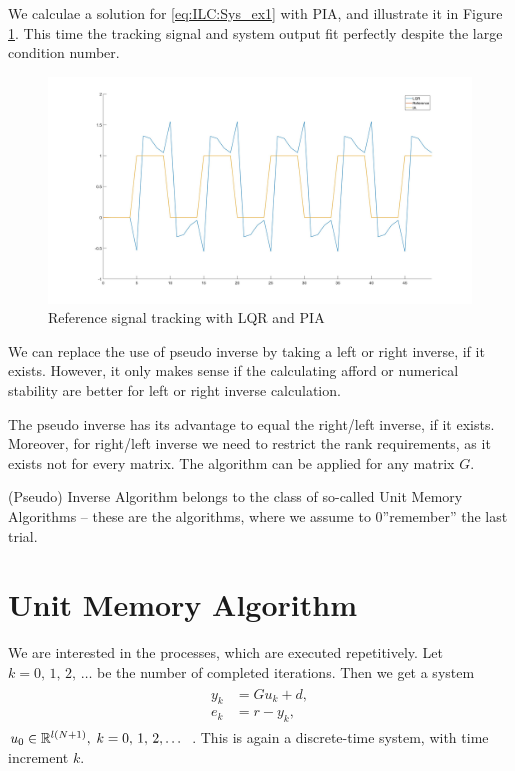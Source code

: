 \begin{exam}
	We calculae a solution for \eqref{eq:ILC:Sys_ex1} with PIA, and illustrate it in Figure \ref{fig:ILC:ex1_PIA}. 	
	This time the tracking signal and system output fit perfectly despite the large condition number. 	
	
	\begin{figure}[ht!]
		\centering
		\includegraphics[width=\textwidth]{fig/ex1_PIA.jpg}
		\caption{Reference signal tracking with LQR and PIA}
		\label{fig:ILC:ex1_PIA}
	\end{figure}
\end{exam}


We can replace the use of pseudo inverse by taking a left or right inverse, if it exists. 
However, it  only makes sense if the calculating afford or numerical stability are better for left or right inverse calculation. 

The pseudo inverse has its advantage to equal the right/left inverse, if it exists. Moreover, for right/left inverse we need to restrict the rank requirements, as it exists not for every matrix. 
The algorithm can be applied for any matrix $G$. 

(Pseudo) Inverse Algorithm belongs to the class of so-called Unit Memory Algorithms -- these are the algorithms, where we assume to 0''remember'' the last trial. 

\section{Unit Memory Algorithm}

We are interested in  the processes, which are executed repetitively. Let $k = 0, \, 1, \, 2, \, \dots $ be the number of completed iterations. Then we get a system 
\begin{align}
\label{eq:unitMemory}
\begin{split}
y_{k} &= G u_k + d,  \\ %
e_k &= r - y_k, 
\end{split}
\end{align}
$u_{0} \in {\mathbb{R}}^{l(N+1)},  \; k =0, \,  1, \, 2, \dots $ .
This is again a discrete-time system, with time increment $k$. 

